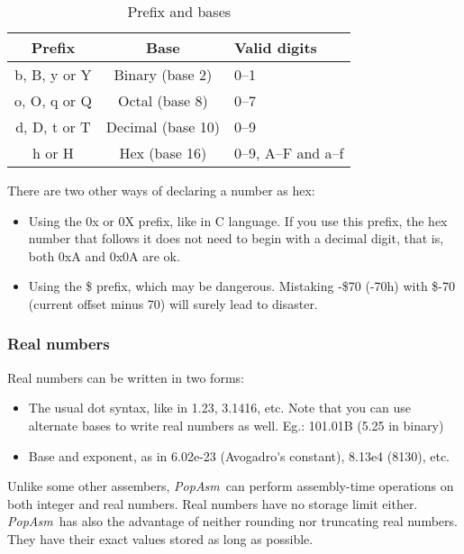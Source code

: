 \documentclass[a4paper,12pt]{book}
\newcommand{\popasm}{\emph{PopAsm}}
\begin{document}
\begin{table}[h]
\begin{center}
\begin{tabular}[h]{ccl}
Prefix & Base & Valid digits\\
\hline
b, B, y or Y & Binary (base 2)  & 0--1 \\
o, O, q or Q & Octal (base 8)  & 0--7 \\
d, D, t or T & Decimal (base 10)  & 0--9 \\
h or H & Hex (base 16)  & 0--9, A--F and a--f\protect{\footnotemark}\\
\hline
\end{tabular}
\caption{Prefix and bases}
\end{center}
\end{table}


There are two other ways of declaring a number as hex:

\begin{itemize}
\item{Using the 0x or 0X prefix}, like in C language. If you use this prefix,
the hex number that follows it does not need to begin with a decimal digit,
that is, both 0xA and 0x0A are ok.
\item{Using the \$ prefix}, which may be dangerous. Mistaking -\$70 (-70h)
with \$-70 (current offset minus 70) will surely lead to disaster.
\end{itemize}

\subsubsection{Real numbers}
Real numbers can be written in two forms:

\begin{itemize}
\item{The usual dot syntax}, like in 1.23, 3.1416, etc. Note that you can
use alternate bases to write real numbers as well. Eg.: 101.01B (5.25 in binary)
\item{Base and exponent}, as in 6.02e-23 (Avogadro\'{}s constant), 8.13e4 (8130),
etc.
\end{itemize}

Unlike some other assembers, \popasm\ can perform assembly-time operations
on both integer and real numbers. Real numbers have no storage limit either.
\popasm\ has also the advantage of neither rounding nor truncating real numbers.
They have their exact values stored as long as possible.
\end{document}
